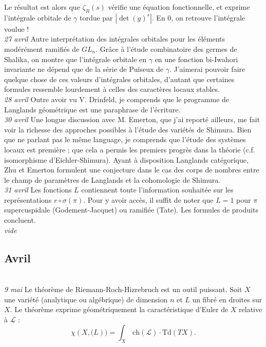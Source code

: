 \documentclass[11.8pt]{amsart}
\theoremstyle{plain}
\theoremstyle{definition}
\theoremstyle{remark}
\begin{document}
Le résultat est alors que $\zeta_R(s)$ vérifie une équation fonctionnelle, et exprime l'intégrale orbitale de $\gamma$ tordue par $|\det(g)^s|$. En $0$, on retrouve l'intégrale voulue !\\

\textsl{27 avril} \quad Autre interprétation des intégrales orbitales pour les éléments modérément ramifiés de $GL_n$. Grâce à l'étude combinatoire des germes de Shalika, on montre que l'intégrale orbitale en $\gamma$ en une fonction bi-Iwahori invariante ne dépend que de la série de Puiseux de $\gamma$. J'aimerai pouvoir faire quelque chose de ces valeurs d'intégrales orbitales, d'autant que certaines formules ressemble lourdement à celles des caractères locaux stables. \\

\textsl{28 avril} \quad Outre avoir vu V. Drinfeld, je comprends que le programme de Langlands géométrique est une paraphrase de l'écriture.\\

\textsl{30 avril}  \quad Une longue discussion avec M. Emerton, que j'ai reporté ailleurs, me fait voir la richesse des approches possibles à l'étude des variétés de Shimura. Bien que ne parlant pas le même language, je comprends que l'étude des systèmes locaux est première ; que cela a permis les premiers progrès dans la théorie (c.f. isomorphisme d'Eichler-Shimura). Ayant à disposition Langlands catégorique, Zhu et Emerton formulent une conjecture dans le cas des corps de nombres entre le champ de paramètres de Langlands et la cohomologie de Shimura.\\

\textsl{31 avril} \quad Les fonctions $L$ contiennent toute l'information souhaitée sur les représentations $r\circ \sigma(\pi)$. Pour y avoir accès, il suffit de noter que $L=1$ pour $\pi$ supercuspidale (Godement-Jacquet) ou ramifiée (Tate). Les formules de produits concluent. \\ 

\textsl{vide}\\

\subsection{Avril}$ $\\

\textsl{9 mai} \quad Le théorème de Riemann-Roch-Hizrebruch est un outil puissant. Soit $X$ une variété (analytique ou algébrique) de dimension $n$ et $L$ un fibré en droites sur $X$. Le théorème exprime géométriquement la caractéristique d'Euler de $X$ relative à $\mathcal L$ : $$\chi(X, \mathcal(L)) = \int_X \, \mathrm{ch}(\mathcal L)\cdot \mathrm{Td}(TX).$$
\end{document}
